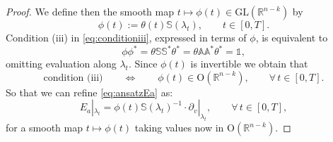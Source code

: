 \documentclass[11pt,a4paper]{article}
\theoremstyle{plain}
\theoremstyle{definition}
\theoremstyle{remark}
\numberwithin{equation}{section}
\newcommand{\R}{\mathbb{R}} %
\newcommand{\A}{\mathbb{A}}
\renewcommand{\S}{\mathbb{S}}
\begin{document}
\begin{proof}
We define then the smooth map $t\mapsto \phi(t) \in \mathrm{GL}(\R^{n-k})$ by
\begin{equation}
\phi(t) := \theta(t)\S(\lambda_t), \qquad t\in [0,T].
\end{equation}
Condition (iii) in \eqref{eq:conditioniii}, expressed in terms of $\phi$, is equivalent to
\begin{equation}
\phi\phi^* = \theta \S\S^*\theta^* = \theta \A\A^*\theta^* = \mathbb{1},
\end{equation}
omitting evaluation along $\lambda_t$. Since $\phi(t)$ is invertible we obtain that
\begin{equation}
\text{condition (iii)} \qquad \Leftrightarrow \qquad \phi(t) \in \mathrm{O}(\R^{n-k}), \qquad \forall\, t\in[0,T].
\end{equation}
So that we can refine \eqref{eq:ansatzEa} as:
\begin{equation}\label{eq:ansatzEarefined}
E_a|_{\lambda_t} = \phi(t) \S(\lambda_t)^{-1} \cdot \partial_v|_{\lambda_t},\qquad \forall\, t\in [0,T],
\end{equation}
for a smooth map $t\mapsto \phi(t)$ taking values now in $\mathrm{O}(\R^{n-k})$. 


\end{proof}
\end{document}
